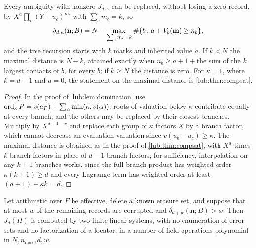 \begin{corollary}\label{lub:cor:weighted}
Every ambiguity with nonzero $J_{d,\kappa}$ can be replaced, without losing a zero record, by
$X^a\prod_c(Y-u_c)^{m_c}$ with $\sum_cm_c=k$, so
\[
 \delta_{d,\kappa}(\mathbf n;B)=N-\max_{\sum_cm_c=k}\#\{b:a+V_b(\mathbf m)\ge n_b\},
\]
and the tree recursion starts with $k$ marks and inherited value $a$. If $k<N$ the maximal distance is
$N-k$, attained exactly when $n_b\ge a+1+{}$the sum of the $k$ largest contacts of $b$, for every $b$; if
$k\ge N$ the distance is zero. For $\kappa=1$, where $k=d-1$ and $a=0$, the statement on the maximal
distance is \cref{lub:thm:compsat}.
\end{corollary}

\begin{proof}
In the proof of \cref{lub:lem:domination} use $\operatorname{ord}_\kappa P=v(a_P)+\sum_\alpha\min(\kappa,v(\alpha))$: roots
of valuation below $\kappa$ contribute equally at every branch, and the others may be replaced by their
closest branches. Multiply by $X^{d-1-r}$ and replace each group of $\kappa$ factors $X$ by a branch
factor, which cannot decrease an evaluation valuation since $v(u_b-u_c)\ge\kappa$. The maximal distance
is obtained as in the proof of \cref{lub:thm:compsat}, with $X^a$ times $k$ branch factors in place of
$d-1$ branch factors; for sufficiency, interpolation on any $k+1$ branches works, since the full branch
product has weighted order $\kappa(k+1)\ge d$ and every Lagrange term has weighted order at least
$(a+1)+\kappa k=d$.

\end{proof}

\begin{theorem}\label{lub:thm:decode}
Let arithmetic over $F$ be effective, delete a known erasure set, and suppose that at most $w$ of the
remaining records are corrupted and $\delta_{d+w}(\mathbf n;B)>w$. Then $J_d(H)$ is computed by two finite
linear systems, with no enumeration of error sets and no factorization of a locator, in a number of
field operations polynomial in $N,n_{\max},d,w$.
\end{theorem}

